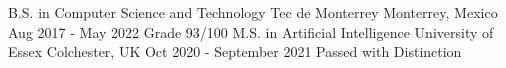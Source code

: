 \begin{cventries}
  \cventry
    {B.S. in Computer Science and Technology}
    {Tec de Monterrey}
    {Monterrey, Mexico} %
    {Aug 2017 - May 2022} %
    {Grade 93/100}
  \cventry
    {M.S. in Artificial Intelligence}
    {University of Essex}
    {Colchester, UK} %
    {Oct 2020 - September 2021} %
    {Passed with Distinction}
\end{cventries}
